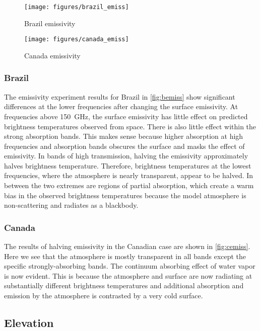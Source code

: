 \documentclass[twocol]{ametsoc}
\begin{document}
\begin{figure}
	\centering
	\texttt{[image: figures/brazil\_emiss]}
	\caption{Brazil emissivity}
	\label{fig:bemiss}
\end{figure}


\begin{figure}
	\centering
	\texttt{[image: figures/canada\_emiss]}
	\caption{Canada emissivity}
	\label{fig:cemiss}
\end{figure}

\subsubsection{Brazil}

The emissivity experiment results for Brazil in \autoref{fig:bemiss} show significant differences at the lower frequencies after changing the surface emissivity.
At frequencies above 150~GHz, the surface emissivity has little effect on predicted brightness temperatures observed from space.
There is also little effect within the strong absorption bands.
This makes sense because higher absorption at high frequencies and absorption bands obscures the surface and masks the effect of emissivity.
In bands of high transmission, halving the emissivity approximately halves brightness temperature.
Therefore, brightness temperatures at the lowest frequencies, where the atmosphere is nearly transparent, appear to be halved.
In between the two extremes are regions of partial absorption, which create a warm bias in the observed brightness temperatures because the model atmosphere is non-scattering and radiates as a blackbody.

\subsubsection{Canada}

The results of halving emissivity in the Canadian case are shown in \autoref{fig:cemiss}.
Here we see that the atmosphere is mostly transparent in all bands except the specific strongly-absorbing bands.
The continuum absorbing effect of water vapor is now evident.
This is because the atmosphere and surface are now radiating at substantially different brightness temperatures and additional absorption and emission by the atmosphere is contrasted by a very cold surface. 

\subsection{Elevation}
\end{document}
